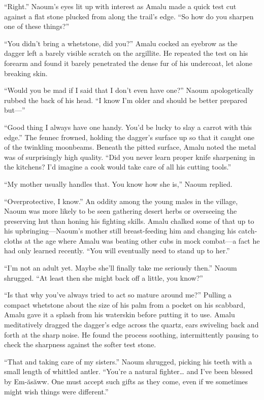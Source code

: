 ``Right.'' Naoum's eyes lit up with interest as Amalu made a quick test cut against a flat stone plucked from along the trail's edge. ``So how do you sharpen one of these things?''

``You didn't bring a whetstone, did you?'' Amalu cocked an eyebrow as the dagger left a barely visible scratch on the argillite. He repeated the test on his forearm and found it barely penetrated the dense fur of his undercoat, let alone breaking skin.

``Would you be mad if I said that I don't even have one?'' Naoum apologetically rubbed the back of his head. ``I know I'm older and should be better prepared but---''

``Good thing I always have one handy. You'd be lucky to slay a carrot with this edge.'' The fennec frowned, holding the dagger's surface up so that it caught one of the twinkling moonbeams. Beneath the pitted surface, Amalu noted the metal was of surprisingly high quality. ``Did you never learn proper knife sharpening in the kitchens? I'd imagine a cook would take care of all his cutting tools.''

``My mother usually handles that. You know how she is,'' Naoum replied.

``Overprotective, I know.'' An oddity among the young males in the village, Naoum was more likely to be seen gathering desert herbs or overseeing the preserving hut than honing his fighting skills. Amalu chalked some of that up to his upbringing---Naoum's mother still breast-feeding him and changing his catch-cloths at the age where Amalu was beating other cubs in mock combat---a fact he had only learned recently. ``You will eventually need to stand up to her.''

``I'm not an adult yet. Maybe she'll finally take me seriously then.'' Naoum shrugged. ``At least then she might back off a little, you know?''

``Is that why you've always tried to act so mature around me?'' Pulling a compact whetstone about the size of his palm from a pocket on his scabbard, Amalu gave it a splash from his waterskin before putting it to use. Amalu meditatively dragged the dagger's edge across the quartz, ears swiveling back and forth at the sharp noise. He found the process soothing, intermittently pausing to check the sharpness against the softer test stone.

``That and taking care of my sisters.'' Naoum shrugged, picking his teeth with a small length of whittled antler. ``You're a natural fighter\ldots{} and I've been blessed by Em-ăsăww. One must accept such gifts as they come, even if we sometimes might wish things were different.''

